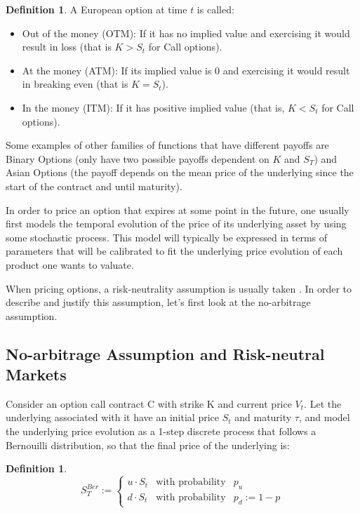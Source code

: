 \documentclass[12,twoside]{mammeTFM}
\theoremstyle{definition}
\newtheorem{definition}[thm]{Definition}
\theoremstyle{remark}
\begin{document}
\begin{definition} A European option at time $t$ is called:
\begin{itemize}
\item {Out of the money (OTM):} If it has no implied value and exercising it would result in loss (that is $K > S_t$ for Call options).
\item {At the money (ATM):} If its implied value is 0 and exercising it would result in breaking even (that is $K = S_t$).
\item {In the money (ITM):} If it has positive implied value (that is, $K < S_t$ for Call options).
\end{itemize}

\end{definition}

Some examples of other families of functions that have different payoffs are Binary Options (only have two possible payoffs dependent on $K$ and $S_T$) and Asian Options (the payoff depends on the mean price of the underlying since the start of the contract and until maturity).

In order to price an option that expires at some point in the future, one usually first models the temporal evolution of the price of its underlying asset by using some stochastic process. This model will typically be expressed in terms of parameters that will be calibrated to fit the underlying price evolution of each product one wants to valuate.

When pricing options, a risk-neutrality assumption is usually taken \cite{hul09}. In order to describe and justify this assumption, let's first look at the no-arbitrage assumption.

\subsection{No-arbitrage Assumption and Risk-neutral Markets}\label{subsec:riks_neutral}

Consider an option call contract C with strike K and current price $V_t$. Let the underlying associated with it have an initial price $S_t$ and maturity $\tau$, and model the underlying price evolution as a 1-step discrete process that follows a Bernouilli distribution, so that the final price of the underlying is:
\begin{definition}
\begin{equation}
S_T^{Ber} := \left\{ \begin{array}{rcl} u \cdot S_t & \mbox{with probability} & p_u \\
 d \cdot S_t & \mbox{with probability} & p_d := 1 -p \end{array}\right.
\end{equation}
\end{definition}
\end{document}

